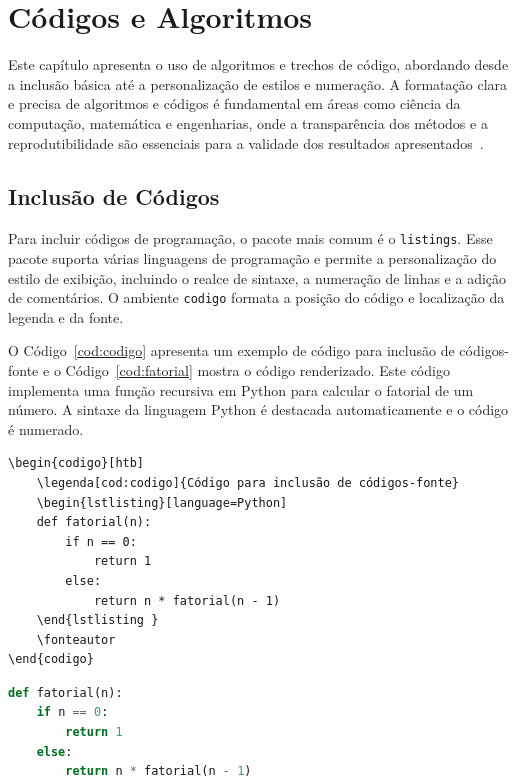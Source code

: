 
\chapter{Códigos e Algoritmos}
\label{cap:codigos}

Este capítulo apresenta o uso de algoritmos e trechos de código, abordando desde a inclusão básica até a personalização de estilos e numeração. A formatação clara e precisa de algoritmos e códigos é fundamental em áreas como ciência da computação, matemática e engenharias, onde a transparência dos métodos e a reprodutibilidade são essenciais para a validade dos resultados apresentados~\cite{knuth1984texbook}.

\section{Inclusão de Códigos}

Para incluir códigos de programação, o pacote mais comum é o \texttt{listings}. Esse pacote suporta várias linguagens de programação e permite a personalização do estilo de exibição, incluindo o realce de sintaxe, a numeração de linhas e a adição de comentários. O ambiente \texttt{codigo} formata a posição do código e localização da legenda e da fonte.

O Código~\ref{cod:codigo} apresenta um exemplo de código para inclusão de códigos-fonte e o Código~\ref{cod:fatorial} mostra o código renderizado.
Este código implementa uma função recursiva em Python para calcular o fatorial de um número. A sintaxe da linguagem Python é destacada automaticamente e o código é numerado.

\begin{codigo}[htb]
\begin{lstlisting}
\begin{codigo}[htb]
    \legenda[cod:codigo]{Código para inclusão de códigos-fonte}
    \begin{lstlisting}[language=Python]
    def fatorial(n):
        if n == 0:
            return 1
        else:
            return n * fatorial(n - 1)
    \end{lstlisting }
    \fonteautor
\end{codigo}
\end{lstlisting}
\fonteautor
\end{codigo}

\begin{codigo}[htb]
\begin{lstlisting}[language=Python]
def fatorial(n):
    if n == 0:
        return 1
    else:
        return n * fatorial(n - 1)
\end{lstlisting}
\fonteautor
\end{codigo}

